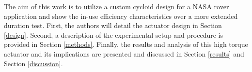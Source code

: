 The aim of this work is to utilize a custom cycloid design for a NASA rover application and show the in-use efficiency characteristics over a more extended duration test. First, the authors will detail the actuator design in Section \ref{design}. Second, a description of the experimental setup and procedure is provided in Section \ref{methods}. Finally, the results and analysis of this high torque actuator and its implications are presented and discussed in Section \ref{results} and Section \ref{discussion}. 